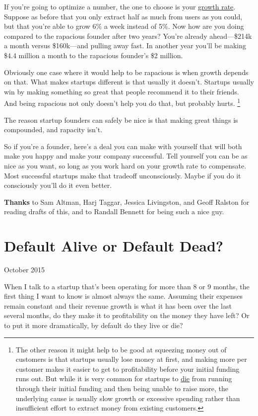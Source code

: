 \documentclass[12pt]{book}
\begin{document}
If you're going to optimize a number, the one to choose is your
\href{growth.html}{growth rate}. Suppose as before that you only extract
half as much from users as you could, but that you're able to grow 6\% a
week instead of 5\%. Now how are you doing compared to the rapacious
founder after two years? You're already ahead---\$214k a month versus
\$160k---and pulling away fast. In another year you'll be making \$4.4
million a month to the rapacious founder's \$2 million.

Obviously one case where it would help to be rapacious is when growth
depends on that. What makes startups different is that usually it
doesn't. Startups usually win by making something so great that people
recommend it to their friends. And being rapacious not only doesn't help
you do that, but probably hurts. \footnote{The other reason it might help to be good at squeezing money out
of customers is that startups usually lose money at first, and making
more per customer makes it easier to get to profitability before your
initial funding runs out. But while it is very common for startups to
\href{pinch.html}{die} from running through their initial funding and
then being unable to raise more, the underlying cause is usually slow
growth or excessive spending rather than insufficient effort to extract
money from existing customers.}

The reason startup founders can safely be nice is that making great
things is compounded, and rapacity isn't.

So if you're a founder, here's a deal you can make with yourself that
will both make you happy and make your company successful. Tell yourself
you can be as nice as you want, so long as you work hard on your growth
rate to compensate. Most successful startups make that tradeoff
unconsciously. Maybe if you do it consciously you'll do it even better.


\textbf{Thanks} to Sam Altman, Harj Taggar, Jessica Livingston, and
Geoff Ralston for reading drafts of this, and to Randall Bennett for
being such a nice guy.
\chapter{Default Alive or Default Dead?}

October 2015

When I talk to a startup that's been operating for more than 8 or 9
months, the first thing I want to know is almost always the same.
Assuming their expenses remain constant and their revenue growth is what
it has been over the last several months, do they make it to
profitability on the money they have left? Or to put it more
dramatically, by default do they live or die?
\end{document}
